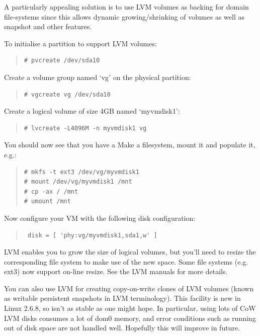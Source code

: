 \documentclass[11pt,twoside,final,openright]{report}
\begin{document}
A particularly appealing solution is to use LVM volumes 
as backing for domain file-systems since this allows dynamic
growing/shrinking of volumes as well as snapshot and other 
features. 

To initialise a partition to support LVM volumes:
\begin{quote}
\begin{verbatim} 
# pvcreate /dev/sda10           
\end{verbatim} 
\end{quote}

Create a volume group named `vg' on the physical partition:
\begin{quote}
\begin{verbatim} 
# vgcreate vg /dev/sda10
\end{verbatim} 
\end{quote}

Create a logical volume of size 4GB named `myvmdisk1':
\begin{quote}
\begin{verbatim} 
# lvcreate -L4096M -n myvmdisk1 vg
\end{verbatim} 
\end{quote}

You should now see that you have a 
Make a filesystem, mount it and populate it, e.g.:
\begin{quote}
\begin{verbatim} 
# mkfs -t ext3 /dev/vg/myvmdisk1
# mount /dev/vg/myvmdisk1 /mnt
# cp -ax / /mnt
# umount /mnt
\end{verbatim} 
\end{quote}

Now configure your VM with the following disk configuration:
\begin{quote}
\begin{verbatim} 
 disk = [ 'phy:vg/myvmdisk1,sda1,w' ]
\end{verbatim} 
\end{quote}

LVM enables you to grow the size of logical volumes, but you'll need
to resize the corresponding file system to make use of the new
space. Some file systems (e.g. ext3) now support on-line resize.  See
the LVM manuals for more details.

You can also use LVM for creating copy-on-write clones of LVM
volumes (known as writable persistent snapshots in LVM
terminology). This facility is new in Linux 2.6.8, so isn't as
stable as one might hope. In particular, using lots of CoW LVM
disks consumes a lot of dom0 memory, and error conditions such as
running out of disk space are not handled well. Hopefully this
will improve in future.
\end{document}
